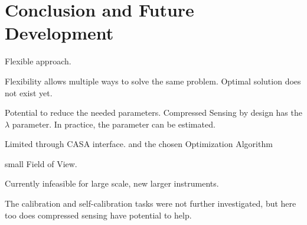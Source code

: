 \section{Conclusion and Future Development}
Flexible approach.

Flexibility allows multiple ways to solve the same problem. Optimal solution does not exist yet. 

Potential to reduce the needed parameters. Compressed Sensing by design has the $\lambda$ parameter. In practice, the parameter can be estimated.

Limited through CASA interface. and the chosen Optimization Algorithm

small Field of View. 


Currently infeasible for large scale, new larger instruments.

The calibration and self-calibration tasks were not further investigated, but here too does compressed sensing have potential to help.